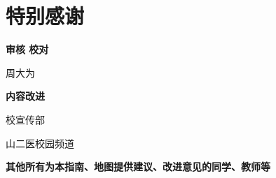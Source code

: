 \chapter*{特别感谢}
\noindent\begin{table*}[h]
    \centering
    \vspace{7em}

    {
        \large
        \textbf{审核 校对}
    }

    \vspace{.8em}
    周大为

    \vspace{3em}

    {
        \large
        \textbf{内容改进}
    }
    \vspace{.8em}

    校宣传部

    山二医校园频道

    \vspace{10em}
    {
        \large
        \textbf{其他所有为本指南、地图提供建议、改进意见的同学、教师等}
    }

\end{table*}